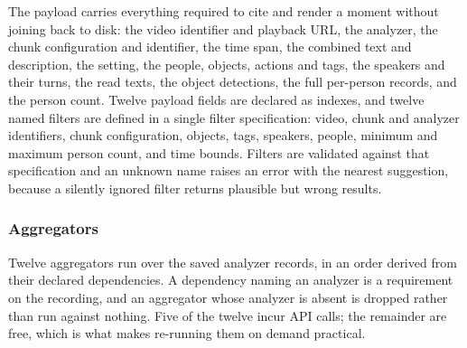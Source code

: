 The payload carries everything required to cite and render a moment without joining back
to disk: the video identifier and playback URL, the analyzer, the chunk configuration
and identifier, the time span, the combined text and description, the setting, the
people, objects, actions and tags, the speakers and their turns, the read texts, the
object detections, the full per-person records, and the person count. Twelve payload
fields are declared as indexes, and twelve named filters are defined in a single filter
specification: video, chunk and analyzer identifiers, chunk configuration, objects,
tags, speakers, people, minimum and maximum person count, and time bounds. Filters are
validated against that specification and an unknown name raises an error with the
nearest suggestion, because a silently ignored filter returns plausible but wrong
results.

\subsubsection*{Aggregators}

Twelve aggregators run over the saved analyzer records, in an order derived from their
declared dependencies. A dependency naming an analyzer is a requirement on the
recording, and an aggregator whose analyzer is absent is dropped rather than run against
nothing. Five of the twelve incur API calls; the remainder are free, which is what makes
re-running them on demand practical.

